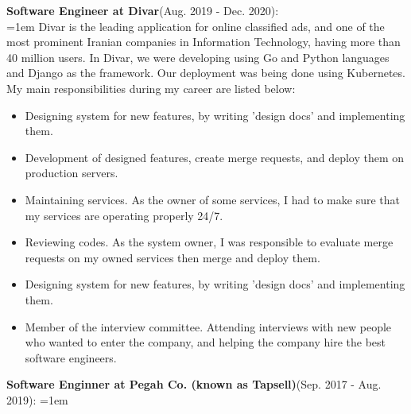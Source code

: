 \documentclass[line, mm]{sampleCV}
\begin{document}
\begin{resume}
\begin{list2}

\item \textbf{Software Engineer at Divar}(Aug. 2019 - Dec. 2020): \\
\hangindent=1em
Divar is the leading application for online classified ads, and one of the most prominent Iranian companies in Information Technology, having more than 40 million users. In Divar, we were developing using Go and Python languages and Django as the framework. Our deployment was being done using Kubernetes. \\ My main responsibilities during my career are listed below:
\begin{itemize}
	\item Designing system for new features, by writing 'design docs' and implementing them.
	\item Development of designed features, create merge requests, and deploy them on production servers.
	\item Maintaining services. As the owner of some services, I had to make sure that my services are operating properly 24/7. 
	\item Reviewing codes. As the system owner, I was responsible to evaluate merge requests on my owned services then merge and deploy them.
	\item Designing system for new features, by writing 'design docs' and implementing them.
	\item Member of the interview committee. Attending interviews with new people who wanted to enter the company, and helping the company hire the best software engineers.
\end{itemize}



\item \textbf{Software Enginner at Pegah Co. (known as Tapsell)}(Sep. 2017 - Aug. 2019):
\hangindent=1em


\end{list2}
\end{resume}
\end{document}
